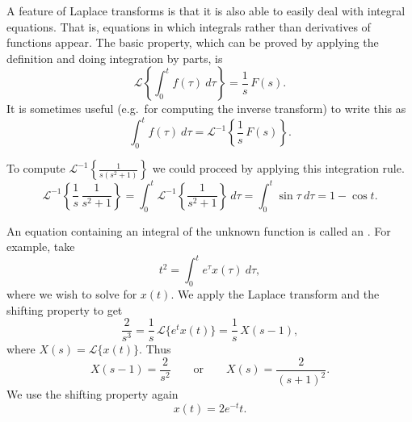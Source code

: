 \documentclass{ximera}
\begin{document}
A feature of Laplace transforms is that it is also able to easily deal with integral equations.  That is, equations in which integrals rather than derivatives of functions appear.  The basic property, which can be proved by applying the definition and doing integration by parts, is 
\begin{equation*}
    \mathcal{L} \left\{ \int_0^t f(\tau) ~ d\tau \right\} = \frac{1}{s} \, F(s) .
\end{equation*}
It is sometimes useful (e.g.\ for computing the inverse transform) to write this as
\begin{equation*}
    \int_0^t f(\tau) ~ d\tau = {\mathcal{L}}^{-1} \left\{ \frac{1}{s} \, F(s) \right\} .
\end{equation*}

\begin{example}
    To compute ${\mathcal{L}}^{-1} \left\{\frac{1}{s(s^2+1)}\right\}$ we could proceed by applying this integration rule.  
    \begin{equation*}
        {\mathcal{L}}^{-1} \left\{ \frac{1}{s} \, \frac{1}{s^2+1} \right\} 
        = \int_0^t {\mathcal{L}}^{-1} \left\{\frac{1}{s^2+1} \right\} ~ d \tau
        =\int_0^t \sin \tau ~ d\tau = 1 - \cos t .
    \end{equation*}
\end{example}

\begin{example}
    An equation containing an integral of the unknown function is called an \emph{}.  For example, take
    \begin{equation*}
        t^2 = \int_0^t e^{\tau} x(\tau) ~d\tau ,
    \end{equation*}
    where we wish to solve for $x(t)$. We apply the Laplace transform and the shifting property to get
    \begin{equation*}
        \frac{2}{s^3} = \frac{1}{s} \, \mathcal{L} \bigl\{ e^{t} x(t) \bigr\} = \frac{1}{s} \, X(s-1) ,
    \end{equation*}
    where $X(s) = \mathcal{L} \bigl\{ x(t) \bigr\}$.  Thus
    \begin{equation*}
        X(s-1) = \frac{2}{s^2} \qquad \text{or} \qquad X(s) = \frac{2}{{(s+1)}^2}.
    \end{equation*}
    We use the shifting property again
    \begin{equation*}
        x(t) = 2 e^{-t} t .
    \end{equation*}
\end{example}
\end{document}
